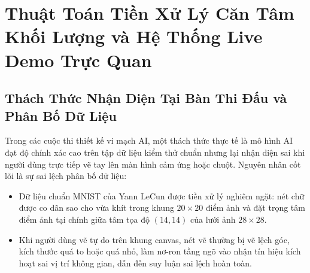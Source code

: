 \documentclass[conference]{IEEEtran}
\begin{document}
\section{Thuật Toán Tiền Xử Lý Căn Tâm Khối Lượng và Hệ Thống Live Demo Trực Quan}
\label{sec:gui_demo}

\subsection{Thách Thức Nhận Diện Tại Bàn Thi Đấu và Phân Bố Dữ Liệu}
\hspace*{1em} Trong các cuộc thi thiết kế vi mạch AI, một thách thức thực tế là mô hình AI đạt độ chính xác cao trên tập dữ liệu kiểm thử chuẩn nhưng lại nhận diện sai khi người dùng trực tiếp vẽ tay lên màn hình cảm ứng hoặc chuột. Nguyên nhân cốt lõi là sự sai lệch phân bố dữ liệu:
\begin{itemize}
    \item Dữ liệu chuẩn MNIST của Yann LeCun \cite{lecun1998} được tiền xử lý nghiêm ngặt: nét chữ được co dãn sao cho vừa khít trong khung $20\times 20$ điểm ảnh và đặt trọng tâm điểm ảnh tại chính giữa tâm tọa độ $(14, 14)$ của lưới ảnh $28\times 28$.
    \item Khi người dùng vẽ tự do trên khung canvas, nét vẽ thường bị vẽ lệch góc, kích thước quá to hoặc quá nhỏ, làm nơ-ron tầng ngõ vào nhận tín hiệu kích hoạt sai vị trí không gian, dẫn đến suy luận sai lệch hoàn toàn.
\end{itemize}
\end{document}
